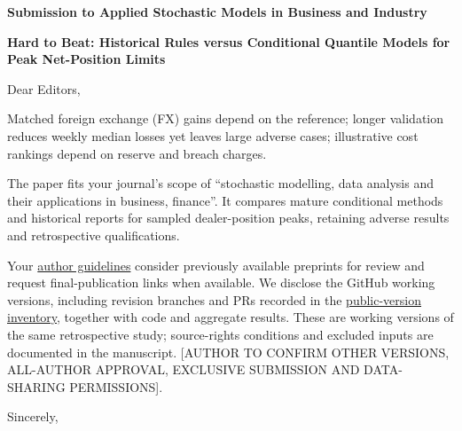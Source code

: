 \documentclass[11pt,a4paper]{article}
\begin{document}
\pagestyle{empty}
\setlength{\parindent}{0pt}
\setlength{\parskip}{10pt}
\textbf{Submission to Applied Stochastic Models in Business and Industry}\par
\textbf{Hard to Beat: Historical Rules versus Conditional Quantile Models for Peak Net-Position Limits}

Dear Editors,

Matched foreign exchange (FX) gains depend on the reference; longer validation reduces weekly median losses yet leaves large adverse cases; illustrative cost rankings depend on reserve and breach charges.

The paper fits your journal's scope of ``stochastic modelling, data analysis and their applications in business, finance''. It compares mature conditional methods and historical reports for sampled dealer-position peaks, retaining adverse results and retrospective qualifications.

Your \href{https://onlinelibrary.wiley.com/page/journal/15264025/homepage/forauthors.html}{author guidelines} consider previously available preprints for review and request final-publication links when available. We disclose the GitHub working versions, including revision branches and PRs recorded in the \href{https://github.com/ByronLi0207/financial-mathematics-paper-20261020/blob/submission-final/notes/submission/public-versions.md}{public-version inventory}, together with code and aggregate results. These are working versions of the same retrospective study; source-rights conditions and excluded inputs are documented in the manuscript. [AUTHOR TO CONFIRM OTHER VERSIONS, ALL-AUTHOR APPROVAL, EXCLUSIVE SUBMISSION AND DATA-SHARING PERMISSIONS].

Sincerely,\par
[TO BE COMPLETED BY AUTHOR]
\end{document}
